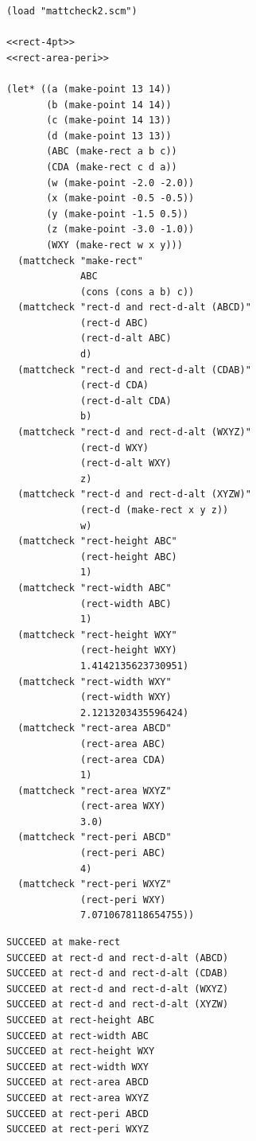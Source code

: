 \documentclass[final,fleqn,titlepage]{article}
\begin{document}
\begin{verbatim}
(load "mattcheck2.scm")

<<rect-4pt>>
<<rect-area-peri>>

(let* ((a (make-point 13 14))
       (b (make-point 14 14))
       (c (make-point 14 13))
       (d (make-point 13 13))
       (ABC (make-rect a b c))
       (CDA (make-rect c d a))
       (w (make-point -2.0 -2.0))
       (x (make-point -0.5 -0.5))
       (y (make-point -1.5 0.5))
       (z (make-point -3.0 -1.0))
       (WXY (make-rect w x y)))
  (mattcheck "make-rect"
             ABC
             (cons (cons a b) c))
  (mattcheck "rect-d and rect-d-alt (ABCD)"
             (rect-d ABC)
             (rect-d-alt ABC)
             d)
  (mattcheck "rect-d and rect-d-alt (CDAB)"
             (rect-d CDA)
             (rect-d-alt CDA)
             b)
  (mattcheck "rect-d and rect-d-alt (WXYZ)"
             (rect-d WXY)
             (rect-d-alt WXY)
             z)
  (mattcheck "rect-d and rect-d-alt (XYZW)"
             (rect-d (make-rect x y z))
             w)
  (mattcheck "rect-height ABC"
             (rect-height ABC)
             1)
  (mattcheck "rect-width ABC"
             (rect-width ABC)
             1)
  (mattcheck "rect-height WXY"
             (rect-height WXY)
             1.4142135623730951)
  (mattcheck "rect-width WXY"
             (rect-width WXY)
             2.1213203435596424)
  (mattcheck "rect-area ABCD"
             (rect-area ABC)
             (rect-area CDA)
             1)
  (mattcheck "rect-area WXYZ"
             (rect-area WXY)
             3.0)
  (mattcheck "rect-peri ABCD"
             (rect-peri ABC)
             4)
  (mattcheck "rect-peri WXYZ"
             (rect-peri WXY)
             7.0710678118654755))
\end{verbatim}

\begin{verbatim}
SUCCEED at make-rect
SUCCEED at rect-d and rect-d-alt (ABCD)
SUCCEED at rect-d and rect-d-alt (CDAB)
SUCCEED at rect-d and rect-d-alt (WXYZ)
SUCCEED at rect-d and rect-d-alt (XYZW)
SUCCEED at rect-height ABC
SUCCEED at rect-width ABC
SUCCEED at rect-height WXY
SUCCEED at rect-width WXY
SUCCEED at rect-area ABCD
SUCCEED at rect-area WXYZ
SUCCEED at rect-peri ABCD
SUCCEED at rect-peri WXYZ
\end{verbatim}
\end{document}
